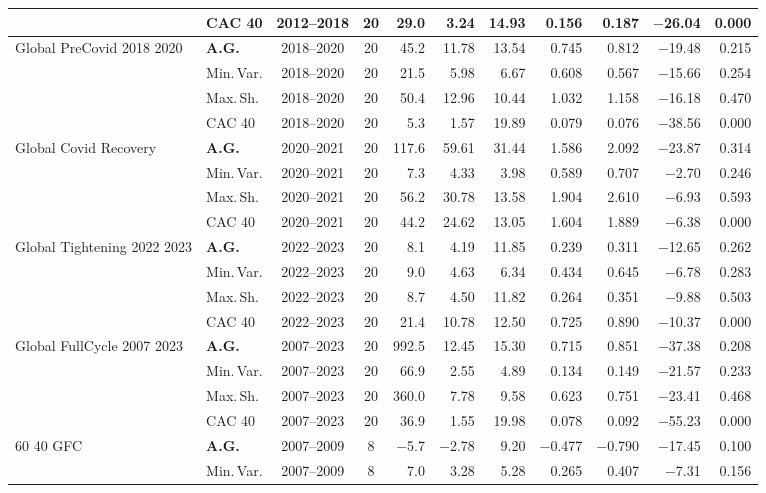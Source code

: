 \begin{longtable}{p{2.6cm} l c c r r r r r r r}
 & CAC 40 & 2012--2018 & 20 & 29.0 & 3.24 & 14.93 & 0.156 & 0.187 & $-$26.04 & 0.000 \\
\midrule
Global PreCovid 2018 2020 & \textbf{A.G.} & 2018--2020 & 20 & 45.2 & 11.78 & 13.54 & 0.745 & 0.812 & $-$19.48 & 0.215 \\
 & Min.\,Var. & 2018--2020 & 20 & 21.5 & 5.98 & 6.67 & 0.608 & 0.567 & $-$15.66 & 0.254 \\
 & Max.\,Sh. & 2018--2020 & 20 & 50.4 & 12.96 & 10.44 & 1.032 & 1.158 & $-$16.18 & 0.470 \\
 & CAC 40 & 2018--2020 & 20 & 5.3 & 1.57 & 19.89 & 0.079 & 0.076 & $-$38.56 & 0.000 \\
\midrule
Global Covid Recovery & \textbf{A.G.} & 2020--2021 & 20 & 117.6 & 59.61 & 31.44 & 1.586 & 2.092 & $-$23.87 & 0.314 \\
 & Min.\,Var. & 2020--2021 & 20 & 7.3 & 4.33 & 3.98 & 0.589 & 0.707 & $-$2.70 & 0.246 \\
 & Max.\,Sh. & 2020--2021 & 20 & 56.2 & 30.78 & 13.58 & 1.904 & 2.610 & $-$6.93 & 0.593 \\
 & CAC 40 & 2020--2021 & 20 & 44.2 & 24.62 & 13.05 & 1.604 & 1.889 & $-$6.38 & 0.000 \\
\midrule
Global Tightening 2022 2023 & \textbf{A.G.} & 2022--2023 & 20 & 8.1 & 4.19 & 11.85 & 0.239 & 0.311 & $-$12.65 & 0.262 \\
 & Min.\,Var. & 2022--2023 & 20 & 9.0 & 4.63 & 6.34 & 0.434 & 0.645 & $-$6.78 & 0.283 \\
 & Max.\,Sh. & 2022--2023 & 20 & 8.7 & 4.50 & 11.82 & 0.264 & 0.351 & $-$9.88 & 0.503 \\
 & CAC 40 & 2022--2023 & 20 & 21.4 & 10.78 & 12.50 & 0.725 & 0.890 & $-$10.37 & 0.000 \\
\midrule
Global FullCycle 2007 2023 & \textbf{A.G.} & 2007--2023 & 20 & 992.5 & 12.45 & 15.30 & 0.715 & 0.851 & $-$37.38 & 0.208 \\
 & Min.\,Var. & 2007--2023 & 20 & 66.9 & 2.55 & 4.89 & 0.134 & 0.149 & $-$21.57 & 0.233 \\
 & Max.\,Sh. & 2007--2023 & 20 & 360.0 & 7.78 & 9.58 & 0.623 & 0.751 & $-$23.41 & 0.468 \\
 & CAC 40 & 2007--2023 & 20 & 36.9 & 1.55 & 19.98 & 0.078 & 0.092 & $-$55.23 & 0.000 \\
\midrule
60 40 GFC & \textbf{A.G.} & 2007--2009 & 8 & $-$5.7 & $-$2.78 & 9.20 & $-$0.477 & $-$0.790 & $-$17.45 & 0.100 \\
 & Min.\,Var. & 2007--2009 & 8 & 7.0 & 3.28 & 5.28 & 0.265 & 0.407 & $-$7.31 & 0.156 \\

\end{longtable}
